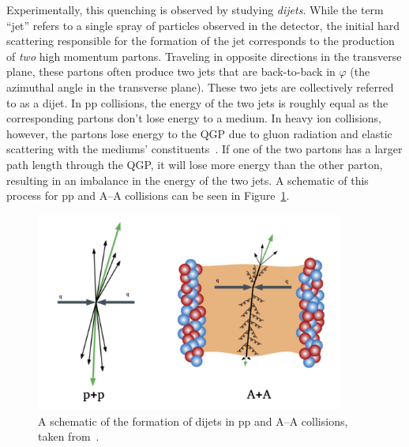 Experimentally, this quenching is observed by studying \textit{dijets}. While the term ``jet'' refers to a single spray of particles observed in the detector, the initial hard scattering responsible for the formation of the jet corresponds to the production of \textit{two} high momentum partons. Traveling in opposite directions in the transverse plane, these partons often produce two jets that are back-to-back in $\varphi$ (the azimuthal angle in the transverse plane). These two jets are collectively referred to as a dijet. In pp collisions, the energy of the two jets is roughly equal as the corresponding partons don't lose energy to a medium. In heavy ion collisions, however, the partons lose energy to the QGP due to gluon radiation and elastic scattering with the mediums' constituents~\cite{ExperimentalSignatures}. If one of the two partons has a larger path length through the QGP, it will lose more energy than the other parton, resulting in an imbalance in the energy of the two jets. A schematic of this process for pp and A--A collisions can be seen in Figure~\ref{fig:dijet_schematic}. 

\begin{figure}[ht]
    \centering
    \includegraphics[width=0.9\textwidth]{figures/introduction/dijet_schematic.png}
    \caption{A schematic of the formation of dijets in pp and A--A collisions, taken from~\cite{DijetSchematic}.}
    \label{fig:dijet_schematic}
\end{figure}

